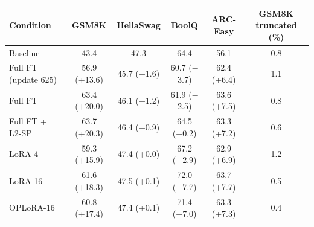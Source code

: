 \begin{tabular}{lccccc}\toprule Condition & GSM8K & HellaSwag & BoolQ & ARC-Easy & GSM8K truncated (\%) \\ \midrule
Baseline & 43.4 & 47.3 & 64.4 & 56.1 & 0.8 \\
Full FT (update 625) & 56.9 (+13.6) & 45.7 ($-$1.6) & 60.7 ($-$3.7) & 62.4 (+6.4) & 1.1 \\
Full FT & 63.4 (+20.0) & 46.1 ($-$1.2) & 61.9 ($-$2.5) & 63.6 (+7.5) & 0.8 \\
Full FT + L2-SP & 63.7 (+20.3) & 46.4 ($-$0.9) & 64.5 (+0.2) & 63.3 (+7.2) & 0.6 \\
LoRA-4 & 59.3 (+15.9) & 47.4 (+0.0) & 67.2 (+2.9) & 62.9 (+6.9) & 1.2 \\
LoRA-16 & 61.6 (+18.3) & 47.5 (+0.1) & 72.0 (+7.7) & 63.7 (+7.7) & 0.5 \\
OPLoRA-16 & 60.8 (+17.4) & 47.4 (+0.1) & 71.4 (+7.0) & 63.3 (+7.3) & 0.4 \\
\bottomrule\end{tabular}
